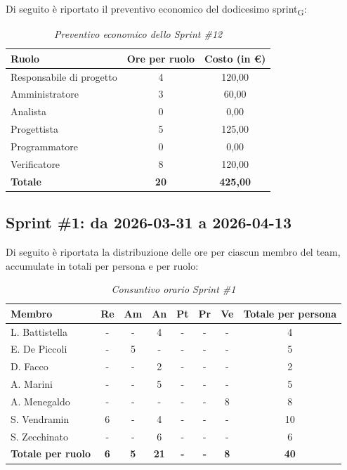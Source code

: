 ﻿\documentclass[a4paper, 10pt, colorlinks=true, linkcolor=black, urlcolor=blue, citecolor=blue, hidelinks]{article}
\renewcommand{\arraystretch}{1.2}
\begin{document}
Di seguito è riportato il preventivo economico del dodicesimo sprint\textsubscript{G}:

\begin{table}[H]
    \centering
    \renewcommand{\arraystretch}{1.4}
    \begin{tabular}{|l|c|c|}
        \hline
        \rowcolor{bluBitless!15}
        \textbf{Ruolo} & \textbf{Ore per ruolo} & \textbf{Costo (in €)} \\
        \hline
        Responsabile di progetto & 4 & 120,00 \\ \hline
        Amministratore & 3 & 60,00 \\ \hline
        Analista & 0 & 0,00 \\ \hline
        Progettista & 5 & 125,00 \\ \hline
        Programmatore & 0 & 0,00 \\ \hline
        Verificatore & 8 & 120,00 \\ \hline
        \rowcolor{bluBitless!8}
        \textbf{Totale} & \textbf{20} & \textbf{425,00} \\ \hline
    \end{tabular}
    \caption{\textit{Preventivo economico dello Sprint \#12}}
\end{table}

\subsection{Sprint \#1: da 2026-03-31 a 2026-04-13}

Di seguito è riportata la distribuzione delle ore per ciascun membro del team,
accumulate in totali per persona e per ruolo:
\begin{table}[H]
    \centering
    \renewcommand{\arraystretch}{1.4}
    \begin{tabular}{|l|c|c|c|c|c|c|c|}
        \hline
        \rowcolor{bluBitless!15}
        \textbf{Membro} & \textbf{Re} & \textbf{Am} & \textbf{An} & \textbf{Pt} & \textbf{Pr} & \textbf{Ve} & \textbf{Totale per persona} \\
        \hline
        L. Battistella & - & - & 4 & - & - & - & 4 \\ \hline
        E. De Piccoli & - & 5 & - & - & - & - & 5 \\ \hline
        D. Facco & - & - & 2 & - & - & - & 2 \\ \hline
        A. Marini & - & - & 5 & - & - & - & 5 \\ \hline
        A. Menegaldo & - & - & - & - & - & 8 & 8 \\ \hline
        S. Vendramin & 6 & - & 4 & - & - & - & 10 \\ \hline
        S. Zecchinato & - & - & 6 & - & - & - & 6 \\ \hline
        \rowcolor{bluBitless!8}
        \textbf{Totale per ruolo} & \textbf{6} & \textbf{5} & \textbf{21} & \textbf{-} & \textbf{-} & \textbf{8} & \textbf{40} \\
        \hline
    \end{tabular}
    \caption{\textit{Consuntivo orario Sprint \#1}}
\end{table}
\end{document}
